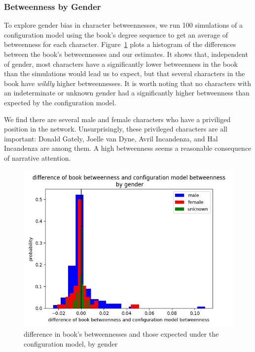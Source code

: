 \subsubsection{Betweenness by Gender}
To explore gender bias in character betweennesses, we run 100 simulations of a configuration model using the book's degree sequence to get an average of betweenness for each character. Figure~\ref{difference-in-betweenness} plots a histogram of the differences between the book's betweennesses and our estimates. It shows that, independent of gender, most characters have a significantly lower betweenness in the book than the simulations would lead us to expect, but that several characters in the book have \textit{wildly} higher betweennesses. It is worth noting that no characters with an indeterminate or unknown gender had a significantly higher betweenness than expected by the configuration model.

We find there are several male and female characters who have a priviliged position in the network. Unsurprisingly, these privileged characters are all important: Donald Gately, Joelle van Dyne, Avril Incandenza, and Hal Incandenza are among them. A high betweenness seems a reasonable consequence of narrative attention.
   
\begin{figure}[ht!]
    \centering
    \includegraphics[width=.4 \textwidth]{images/gender_betweenness_by_gender.png}
    \caption{difference in book's betweennesses and those expected under the configuration model, by gender}
    \label{difference-in-betweenness}
\end{figure}
